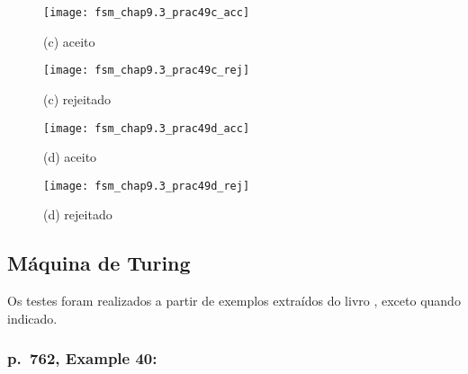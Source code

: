 \begin{table}[H]
    \begin{minipage}[b]{0.5\linewidth}
        \begin{figure}[H]
            \centering
            \texttt{[image: fsm\_chap9.3\_prac49c\_acc]}
            \caption{(c) aceito}
            \label{fig:fsm_chap9.3_prac49c_acc}
        \end{figure}
    \end{minipage}%
    \begin{minipage}[b]{0.5\linewidth}
        \begin{figure}[H]
            \centering
            \texttt{[image: fsm\_chap9.3\_prac49c\_rej]}
            \caption{(c) rejeitado}
            \label{fig:fsm_chap9.3_prac49c_rej}
        \end{figure}
    \end{minipage}
    \newline
    \begin{minipage}[b]{0.5\linewidth}
        \begin{figure}[H]
            \centering
            \texttt{[image: fsm\_chap9.3\_prac49d\_acc]}
            \caption{(d) aceito}
            \label{fig:fsm_chap9.3_prac49d_acc}
        \end{figure}
    \end{minipage}%
    \begin{minipage}[b]{0.5\linewidth}
        \begin{figure}[H]
            \centering
            \texttt{[image: fsm\_chap9.3\_prac49d\_rej]}
            \caption{(d) rejeitado}
            \label{fig:fsm_chap9.3_prac49d_rej}
        \end{figure}
    \end{minipage}
\end{table}

\subsection{Máquina de Turing}

Os testes foram realizados a partir de exemplos extraídos do livro
\cite[cap.\ 9.4]{judith}, exceto quando indicado.

\subsubsection*{p.\ 762, Example 40:}

